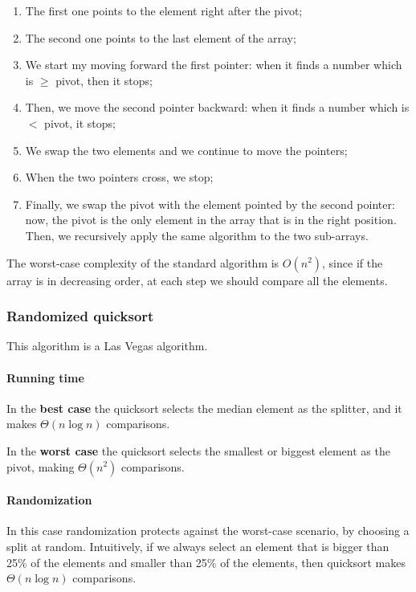 \begin{enumerate}
    \item The first one points to the element right after the pivot;
    \item The second one points to the last element of the array;
    \item We start my moving forward the first pointer: when it finds a number which is $\geq$ pivot, then it stops;
    \item Then, we move the second pointer backward: when it finds a number which is $<$ pivot, it stops;
    \item We swap the two elements and we continue to move the pointers;
    \item When the two pointers cross, we stop;
    \item Finally, we swap the pivot with the element pointed by the second pointer: now, the pivot is the only element in the array that is in the right position. Then, we recursively apply the same algorithm to the two sub-arrays.
\end{enumerate}

The worst-case complexity of the standard algorithm is $O(n^2)$, since if the array is in decreasing order, at each step we should compare all the elements.

\subsubsection{Randomized quicksort}

This algorithm is a Las Vegas algorithm.

\paragraph{Running time} In the \textbf{best case} the quicksort selects the median element as the splitter, and it makes $\Theta(n \log n)$ comparisons. 

In the \textbf{worst case} the quicksort selects the smallest or biggest element as the pivot, making $\Theta(n^2)$ comparisons.

\paragraph{Randomization} In this case randomization protects against the worst-case scenario, by choosing a split at random. Intuitively, if we always select an element that is bigger than 25\% of the elements and smaller than 25\% of the elements, then quicksort makes $\Theta(n \log n)$ comparisons.

